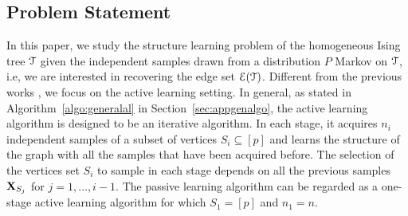 \subsection{Problem Statement}
In this paper, we study the structure learning problem of the homogeneous Ising tree $\mathcal{T}$ given the independent samples drawn from a distribution $P$ Markov on $\mathcal{T}$, i.e, we are interested in recovering the edge set $\mathcal{E}(\mathcal{T})$. Different from the 
previous works \cite{chow1968approximating,tan2011large}, we focus on the active learning setting. In general, as stated in Algorithm~\ref{algo:generalal} in Section~\ref{sec:appgenalgo}, the active learning algorithm is designed to be an iterative algorithm. In each stage, it acquires $n_{i}$ independent samples of a subset 
of vertices $S_{i}\subseteq [p]$ and learns the structure of the graph with all the samples that have been acquired before. The selection of the vertices set $S_{i}$ to sample in each stage depends on all the 
previous samples $\mathbf{X}_{S_{j}}$ for $j=1,\ldots,i-1$. The passive learning algorithm can be regarded as a one-stage active learning algorithm for which $S_{1}=[p]$ and $n_{1}=n$.

